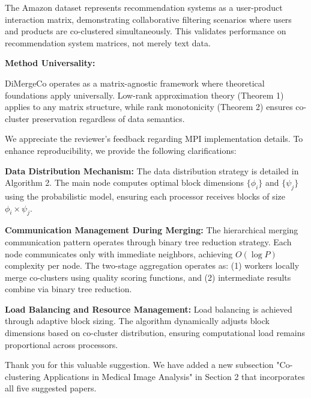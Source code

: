 \documentclass{ar2rc}
\begin{document}
The Amazon dataset represents recommendation systems as a user-product interaction matrix, demonstrating collaborative filtering scenarios where users and products are co-clustered simultaneously. This validates performance on recommendation system matrices, not merely text data.

\textbf{Method Universality:}

DiMergeCo operates as a matrix-agnostic framework where theoretical foundations apply universally. Low-rank approximation theory (Theorem 1) applies to any matrix structure, while rank monotonicity (Theorem 2) ensures co-cluster preservation regardless of data semantics.


\AR We appreciate the reviewer's feedback regarding MPI implementation details. To enhance reproducibility, we provide the following clarifications:

\textbf{Data Distribution Mechanism:}
The data distribution strategy is detailed in Algorithm 2. The main node computes optimal block dimensions $\{\phi_i\}$ and $\{\psi_j\}$ using the probabilistic model, ensuring each processor receives blocks of size $\phi_i \times \psi_j$.

\textbf{Communication Management During Merging:}
The hierarchical merging communication pattern operates through binary tree reduction strategy. Each node communicates only with immediate neighbors, achieving $O(\log P)$ complexity per node. The two-stage aggregation operates as: (1) workers locally merge co-clusters using quality scoring functions, and (2) intermediate results combine via binary tree reduction.

\textbf{Load Balancing and Resource Management:}
Load balancing is achieved through adaptive block sizing. The algorithm dynamically adjusts block dimensions based on co-cluster distribution, ensuring computational load remains proportional across processors.


\AR Thank you for this valuable suggestion. We have added a new subsection "Co-clustering Applications in Medical Image Analysis" in Section 2 that incorporates all five suggested papers.
\end{document}
